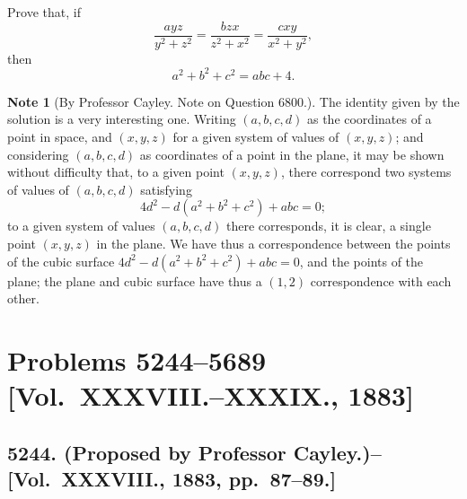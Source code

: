 \documentclass[11pt,a4paper]{article}
\theoremstyle{definition}
\newtheorem*{note}{Note}
\begin{document}
Prove that, if
\[
\frac{ayz}{y^2+z^2} = \frac{bzx}{z^2+x^2} = \frac{cxy}{x^2+y^2},
\]
then
\[
a^2+b^2+c^2 = abc+4.
\]

\begin{note}[By Professor Cayley. Note on Question 6800.]
The identity given by the solution is a very interesting one. Writing $(a,b,c,d)$ as the coordinates of a point in space, and $(x,y,z)$ for a given system of values of $(x,y,z)$; and considering $(a,b,c,d)$ as coordinates of a point in the plane, it may be shown without difficulty that, to a given point $(x,y,z)$, there correspond two systems of values of $(a,b,c,d)$ satisfying
\[
4d^2 - d(a^2+b^2+c^2) + abc = 0;
\]
to a given system of values $(a,b,c,d)$ there corresponds, it is clear, a single point $(x,y,z)$ in the plane. We have thus a correspondence between the points of the cubic surface $4d^2 - d(a^2+b^2+c^2) + abc = 0$, and the points of the plane; the plane and cubic surface have thus a $(1,2)$ correspondence with each other.
\end{note}

\newpage

\section*{Problems 5244--5689 [Vol.~XXXVIII.--XXXIX., 1883]}

\subsection*{5244. (Proposed by Professor Cayley.)\---[Vol.~XXXVIII., 1883, pp.~87--89.]}
\end{document}
